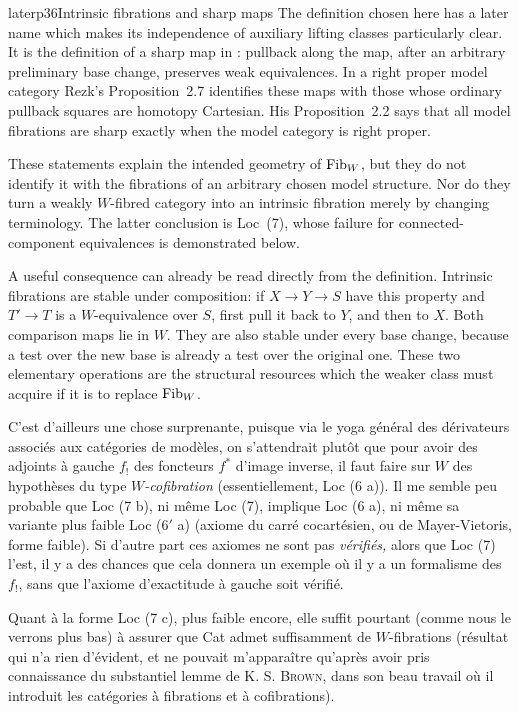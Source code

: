 \begin{dcomment}{later}{p36}{Intrinsic fibrations and sharp maps}
The definition chosen here has a later name which makes its independence of auxiliary lifting classes particularly clear. It is the definition of a sharp map in \citet[Section~2]{Rezk1998Sharp}: pullback along the map, after an arbitrary preliminary base change, preserves weak equivalences. In a right proper model category Rezk's Proposition~2.7 identifies these maps with those whose ordinary pullback squares are homotopy Cartesian. His Proposition~2.2 says that all model fibrations are sharp exactly when the model category is right proper.

These statements explain the intended geometry of $\mathrm{Fib}_W$, but they do not identify it with the fibrations of an arbitrary chosen model structure. Nor do they turn a weakly $W$-fibred category into an intrinsic fibration merely by changing terminology. The latter conclusion is Loc~(7), whose failure for connected-component equivalences is demonstrated below.

A useful consequence can already be read directly from the definition. Intrinsic fibrations are stable under composition: if $X\to Y\to S$ have this property and $T'\to T$ is a $W$-equivalence over $S$, first pull it back to $Y$, and then to $X$. Both comparison maps lie in $W$. They are also stable under every base change, because a test over the new base is already a test over the original one. These two elementary operations are the structural resources which the weaker class must acquire if it is to replace $\mathrm{Fib}_W$.
\end{dcomment}


C'est d'ailleurs une chose surprenante, puisque via le yoga général des dérivateurs associés aux catégories de modèles, on s'attendrait plutôt que pour avoir des adjoints à gauche $f_!$ des foncteurs $f^*$ d'image inverse, il faut faire sur $W$ des hypothèses du type \textit{$W$-cofibration}
(essentiellement, Loc (6 a)). Il me semble peu probable que Loc (7 b), ni même Loc (7), implique Loc (6 a), ni même sa variante plus faible Loc (6$'$ a) (axiome du carré cocartésien, ou de Mayer-Vietoris, forme faible). Si d'autre part ces axiomes ne sont pas \textit{vérifiés,} alors que Loc (7) l'est, il y a des chances que cela donnera un exemple où il y a un formalisme des $f_!$, sans que l'axiome d'exactitude à gauche soit vérifié.

Quant à la forme Loc (7 c), plus faible encore, elle suffit pourtant (comme nous le verrons plus bas) à assurer que Cat admet suffisamment de $W$-fibrations  (résultat qui n'a rien d'évident, et ne pouvait m'apparaître qu'après avoir pris connaissance du substantiel lemme de K. S. \textsc{Brown}, dans son beau travail où il introduit les catégories à fibrations et à cofibrations).

